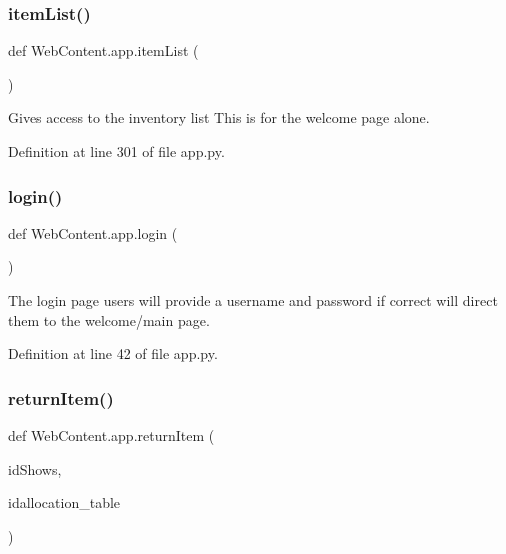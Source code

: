 \subsubsection{\texorpdfstring{item\+List()}{itemList()}}
{\footnotesize\ttfamily def Web\+Content.\+app.\+item\+List (\begin{DoxyParamCaption}{ }\end{DoxyParamCaption})}

\begin{DoxyVerb}Gives access to the inventory list
This is for the welcome page alone.  
\end{DoxyVerb}
 

Definition at line 301 of file app.\+py.

\mbox{\label{namespace_web_content_1_1app_a1e55cf68c2c2c883c82749a8725e068c}} 
\subsubsection{\texorpdfstring{login()}{login()}}
{\footnotesize\ttfamily def Web\+Content.\+app.\+login (\begin{DoxyParamCaption}{ }\end{DoxyParamCaption})}

\begin{DoxyVerb}The login page
users will provide a username and password if correct
will direct them to the welcome/main page.
\end{DoxyVerb}
 

Definition at line 42 of file app.\+py.

\mbox{\label{namespace_web_content_1_1app_a7223fddf3b4dbcc57318bd9b85b30c5d}} 
\subsubsection{\texorpdfstring{return\+Item()}{returnItem()}}
{\footnotesize\ttfamily def Web\+Content.\+app.\+return\+Item (\begin{DoxyParamCaption}\item[{}]{id\+Shows,  }\item[{}]{idallocation\+\_\+table }\end{DoxyParamCaption})}

